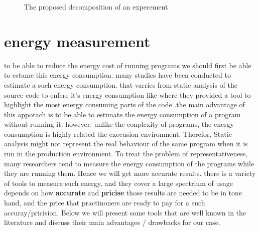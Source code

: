 



\begin{figure}[!hbt]
    \caption{The proposed decomposition of an experement~\cite{stephen_evaluate_2012}}\label{fig:soa_expermiment component}
\end{figure}

\section{energy measurement}
to be able to reduce the energy cost of running programs we should first be able to estame this energy consumption.
many studies have been conducted to estimate a such energy consumption. that varries from static analysis of the source code to enfere it's energy consumption like \citeauthor{pereira_helping_2017} where they provided a tool to highlight the most energy consuming parts of the code \cite{pereira_helping_2017}.the main advantage of this apporach is to be able to estimate the energy consumption of a program without running it. however. unlike the conplexity of programs, the energy consumption is highly related the execusion environment. Therefor, Static analysis might not represent the real behaviour of the same program when it is run in the production environment.
To treat the problem of representativeness, many researchers tend to measure the energy consumption of the programs while they are running them. Hence we will get more accurate results.
there is a variety of tools to measure such energy, and they cover a large spectrium of usage depends on how \textbf{accurate} and \textbf{pricise} those results are needed to be in tone hand, and the price that practinoners are ready to pay for a such accuray/pricision.
Below we will present some tools that are well known in the literature and discuss their main advantages / drawbacks for our case.
